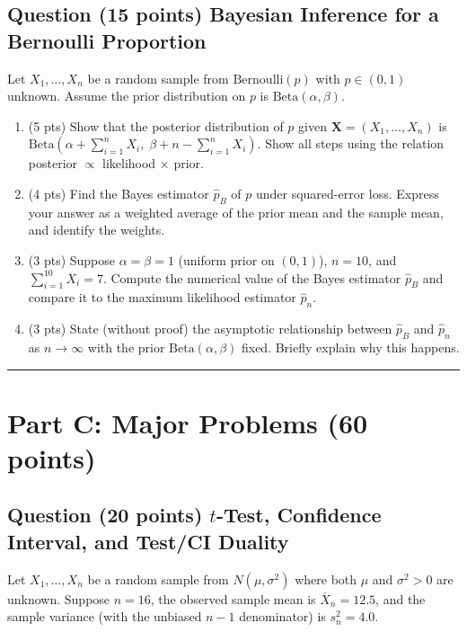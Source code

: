 \documentclass[11pt]{article}
\newcounter{qnum}
\newcommand{\question}[2]{\stepcounter{qnum}\subsection*{Question \theqnum \quad (#1 points) \hfill #2}}
\begin{document}
\question{15}{Bayesian Inference for a Bernoulli Proportion}
Let $X_1,\ldots,X_n$ be a random sample from $\mathrm{Bernoulli}(p)$ with $p \in (0,1)$ unknown. Assume the prior distribution on $p$ is $\mathrm{Beta}(\alpha,\beta)$.

\begin{enumerate}[label=(\alph*),leftmargin=2em]
    \item (5 pts) Show that the posterior distribution of $p$ given $\mathbf{X} = (X_1,\ldots,X_n)$ is $\mathrm{Beta}\!\left(\alpha + \sum_{i=1}^n X_i,\; \beta + n - \sum_{i=1}^n X_i\right)$. Show all steps using the relation posterior $\propto$ likelihood $\times$ prior.
    \item (4 pts) Find the Bayes estimator $\hat p_B$ of $p$ under squared-error loss. Express your answer as a weighted average of the prior mean and the sample mean, and identify the weights.
    \item (3 pts) Suppose $\alpha = \beta = 1$ (uniform prior on $(0,1)$), $n = 10$, and $\sum_{i=1}^{10} X_i = 7$. Compute the numerical value of the Bayes estimator $\hat p_B$ and compare it to the maximum likelihood estimator $\hat p_n$.
    \item (3 pts) State (without proof) the asymptotic relationship between $\hat p_B$ and $\hat p_n$ as $n \to \infty$ with the prior $\mathrm{Beta}(\alpha,\beta)$ fixed. Briefly explain why this happens.
\end{enumerate}

\bigskip
\hrule
\bigskip

\section*{Part C: Major Problems \hfill (60 points)}

\question{20}{$t$-Test, Confidence Interval, and Test/CI Duality}
Let $X_1,\ldots,X_n$ be a random sample from $N(\mu,\sigma^2)$ where both $\mu$ and $\sigma^2 > 0$ are unknown. Suppose $n = 16$, the observed sample mean is $\overline{X}_n = 12.5$, and the sample variance (with the unbiased $n-1$ denominator) is $s_n^2 = 4.0$.
\end{document}

